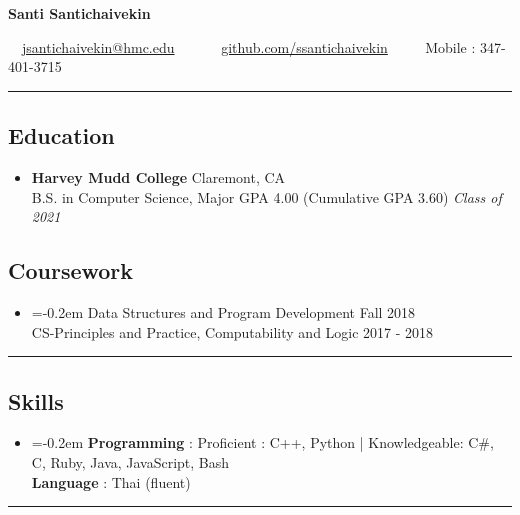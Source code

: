\documentclass[10.5pt,letterpaper]{article}
\begin{document}
\begin{center}
{\Large \textbf{Santi Santichaivekin}}

\ \ \href{mailto:jsantichaivekin@hmc.edu}{jsantichaivekin@hmc.edu}\ \ 
\ \ \textbullet
\ \ \href{https://github.com/ssantichaivekin}{github.com/ssantichaivekin}
\ \ \textbullet
\ \ Mobile : 347-401-3715

\end{center}


\hrule
\vspace{-1.0em}
\subsection*{Education}
  \begin{itemize}
    \parskip=-0.5em

    \item[]
    \textbf{Harvey Mudd College} \hfill
      Claremont, CA\\
    {B.S. in Computer Science, Major GPA 4.00 (Cumulative GPA 3.60) \hfill \emph{Class of 2021}}
  \end{itemize}
  \vspace{-2.2em}
\subsection*{Coursework}
\begin{itemize}
\item[]
    \parskip=-0.2em
  Data Structures and Program Development \hfill Fall 2018\\
  CS-Principles and Practice, Computability and Logic \hfill 2017 - 2018

\end{itemize}

\hrule
\vspace{-1.0em}
\subsection*{Skills}
\begin{itemize}
\item[]
    \parskip=-0.2em
  \textbf{Programming} : Proficient : C++, Python | Knowledgeable: C\#, C, Ruby, Java, JavaScript, Bash\\
  \textbf{Language} : Thai (fluent)
    
\end{itemize}

\hrule
\vspace{-1.0em}
\end{document}
